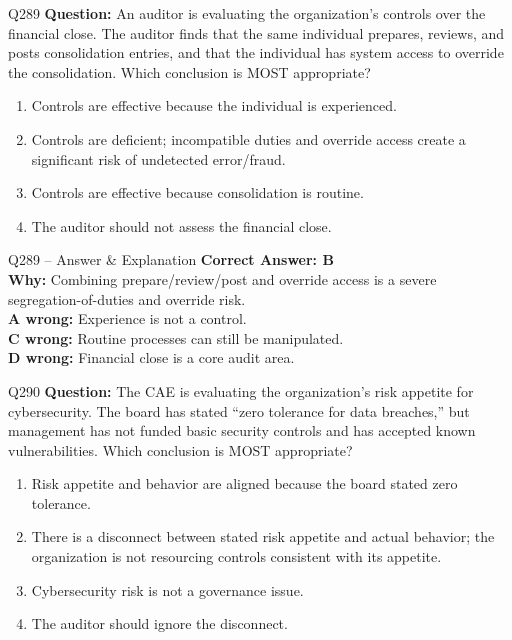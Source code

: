 \documentclass[aspectratio=169,10pt]{beamer}
\begin{document}
	\begin{frame}[t]{Q289}
		\small
		\textbf{Question:} An auditor is evaluating the organization's controls over the financial close. The auditor finds that the same individual prepares, reviews, and posts consolidation entries, and that the individual has system access to override the consolidation. Which conclusion is MOST appropriate?
		\begin{enumerate}[label=\Alph*.,itemsep=1pt,topsep=2pt]
			\item Controls are effective because the individual is experienced.
			\item Controls are deficient; incompatible duties and override access create a significant risk of undetected error/fraud.
			\item Controls are effective because consolidation is routine.
			\item The auditor should not assess the financial close.
		\end{enumerate}
	\end{frame}
	
	\begin{frame}[t]{Q289 -- Answer \& Explanation}
		\small
		\textbf{Correct Answer: B} \\[4pt]
		\textbf{Why:} Combining prepare/review/post and override access is a severe segregation-of-duties and override risk. \\[4pt]
		\textbf{A wrong:} Experience is not a control. \\[2pt]
		\textbf{C wrong:} Routine processes can still be manipulated. \\[2pt]
		\textbf{D wrong:} Financial close is a core audit area.
	\end{frame}
	
	\begin{frame}[t]{Q290}
		\small
		\textbf{Question:} The CAE is evaluating the organization's risk appetite for cybersecurity. The board has stated ``zero tolerance for data breaches,'' but management has not funded basic security controls and has accepted known vulnerabilities. Which conclusion is MOST appropriate?
		\begin{enumerate}[label=\Alph*.,itemsep=1pt,topsep=2pt]
			\item Risk appetite and behavior are aligned because the board stated zero tolerance.
			\item There is a disconnect between stated risk appetite and actual behavior; the organization is not resourcing controls consistent with its appetite.
			\item Cybersecurity risk is not a governance issue.
			\item The auditor should ignore the disconnect.
		\end{enumerate}
	\end{frame}
	
\end{document}
